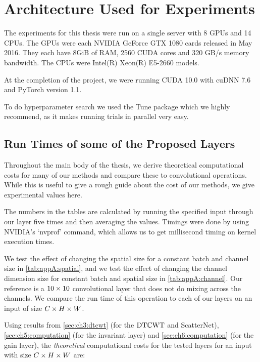 \chapter{Architecture Used for Experiments} \label{app:arch}
\def \path {dtcwt_scat}
\def \imgpath {\path/images}

The experiments for this thesis were run on a single server with 8 GPUs and 14
CPUs. The GPUs were each NVIDIA GeForce GTX 1080 cards released in May 2016.
They each have 8GiB of RAM, 2560 CUDA cores and 320 GB/s memory bandwidth.
The CPUs were Intel(R) Xeon(R) E5-2660 models. 

At the completion of the project, we were running CUDA 10.0 with cuDNN 7.6 and 
PyTorch version 1.1.

To do hyperparameter search we used the Tune package \cite{liaw2018tune} which
we highly recommend, as it makes running trials in parallel very easy.

\section{Run Times of some of the Proposed Layers}
Throughout the main body of the thesis, we derive theoretical computational
costs for many of our methods and compare these to convolutional operations.
While this is useful to give a rough guide about the cost of our methods, we
give experimental values here. 

The numbers in the tables are calculated by running the specified input through our
layer five times and then averaging the values. Timings were done by using
NVIDIA's `nvprof' command, which allows us to get millisecond timing on kernel
execution times.

We test the effect of changing the spatial size for a constant batch and channel
size in \autoref{tab:appA:spatial}, and we test the effect of changing the
channel dimension size for constant batch and spatial size in
\autoref{tab:appA:channel}. Our reference is a $10\times 10$ convolutional layer
that does not do mixing across the channels. We compare the run time of this operation
to each of our layers on an input of size $C\times H\times W$.

Using results from \autoref{sec:ch3:dtcwt} (for the $\mathrm{DT}\mathbb{C}\mathrm{WT}$ and ScatterNet),
\autoref{sec:ch5:computation} (for the invariant layer) and
\autoref{sec:ch6:computation} (for the gain layer), the \emph{theoretical}
computational costs for the tested layers for an input with size $C\times H\times W$
are:

